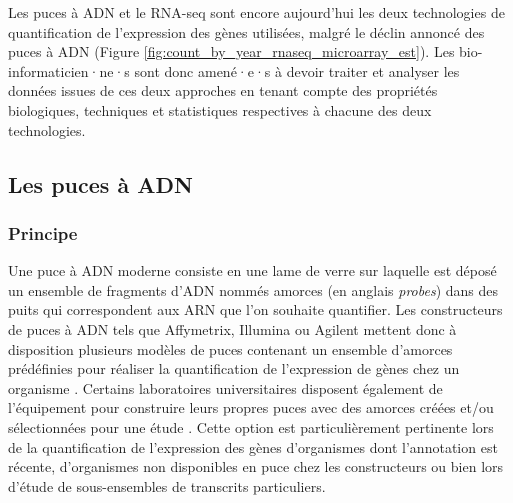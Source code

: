 Les puces à ADN et le RNA-seq sont encore aujourd'hui les deux technologies de quantification de l'expression des gènes utilisées, malgré le déclin annoncé des puces à ADN (Figure \ref{fig:count_by_year_rnaseq_microarray_est}). Les bio-informaticien·ne·s sont donc amené·e·s à devoir traiter et analyser les données issues de ces deux approches en tenant compte des propriétés biologiques, techniques et statistiques respectives à chacune des deux technologies.




\subsection{Les puces à ADN}

\subsubsection{Principe}


Une puce à ADN moderne consiste en une lame de verre sur laquelle est déposé un ensemble de fragments d'ADN nommés amorces (en anglais \textit{probes}) dans des puits qui correspondent aux ARN que l'on souhaite quantifier. Les constructeurs de puces à ADN tels que Affymetrix, Illumina ou Agilent mettent donc à disposition plusieurs modèles de puces contenant un ensemble d'amorces prédéfinies pour réaliser la quantification de l'expression de gènes chez un organisme \cite{Liu2010}. Certains laboratoires universitaires disposent également de l'équipement pour construire leurs propres puces avec des amorces créées et/ou sélectionnées pour une étude \cite{Thompson2001Apr}. Cette option est particulièrement pertinente lors de la quantification de l'expression des gènes d'organismes dont l'annotation est récente, d'organismes non disponibles en puce chez les constructeurs ou bien lors d'étude de sous-ensembles de transcrits particuliers.


